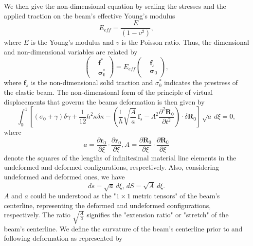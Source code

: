 \documentclass[a4paper,12pt]{article}
\begin{document}
We then give the non-dimensional equation by scaling the stresses and the applied traction on the beam's effective Young's modulus
\begin{equation}
	\label{eqn:29}
	E_{eff}=\frac{E}{(1-v^2)},
\end{equation}
where $E$ is the Young's modulus and $v$ is the Poisson ratio. Thus, the dimensional and non-dimensional variables are related by 
\begin{equation}
	\label{eqn:30}
	\left(\begin{aligned}
		&\mathbf{f^*} \\
		&\mathbf{\sigma}_0^*
	\end{aligned}\right)
	=E_{eff}\left(\begin{aligned}
		&\textbf{f}_{s} \\
		&\mathbf{\sigma}_0
	\end{aligned}\right),
\end{equation}
where $\textbf{f}_{s}$ is the non-dimensional solid traction and $\sigma^*_0$ indicates the prestress of the elastic beam.
The non-dimensional form of the principle of virtual displacements that governs the beams deformation is then given by
\begin{equation}
	\label{eqn:31}
	\int^1_0 \left[(\sigma_0+\gamma)\delta\gamma+\frac{1}{12}h^2\kappa\delta\kappa-\left(\frac{1}{h}\sqrt{\frac{A}{a}}\,\textbf{f}_{s}-\Lambda^2\frac{\partial^2\textbf{R}_0}{\partial t^2}
	\right)\cdot \delta \textbf{R}_0
	\right]\,\sqrt{a}\,d\xi=0,
\end{equation}
where 
\begin{equation}
	\label{eqn:32} a=\frac{\partial\textbf{r}_0}{\partial\xi}\cdot\frac{\partial\textbf{r}_0}{\partial\xi}, A=\frac{\partial\textbf{R}_0}{\partial\xi}\cdot\frac{\partial\textbf{R}_0}{\partial\xi}
\end{equation}
denote the squares of the lengths of infinitesimal material line elements in the undeformed and deformed configurations, respectively.
Also, considering undeformed and deformed ones, we have 
\begin{equation}
	\label{eqn:33}
	ds=\sqrt{a}\,d\xi,\,dS=\sqrt{A}\,d\xi.
\end{equation}
$A$ and $a$ could be understood as the "$1\times1$ metric tensors" of the beam's centerline, representing the deformed and undeformed configurations, respectively. 
The ratio $\sqrt{\frac{A}{a}}$ signifies the "extension ratio" or "stretch" of the beam's centerline. We define the curvature of the beam's centerline prior to and following deformation as represented by 
\end{document}
